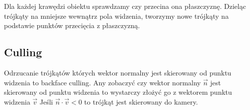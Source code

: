 \documentclass{../notatki}
\begin{document}
Dla każdej krawędzi obiektu sprawdzamy czy przecina ona płaszczyznę.
Dzieląc trójkąty na mniejsze wewnątrz pola widzenia, tworzymy nowe trójkąty na podstawie punktów przecięcia z płaszczyzną.

\subsection{Culling}

Odrzucanie trójkątów których wektor normalny jest skierowany od punktu widzenia to backface culling.
Any zobaczyć czy wektor normalny $\vec{n}$ jest skierowany od punktu widzenia to wystarczy złożyć go z wektorem punktu widzenia $\vec{v}$
Jeśli $\vec{n} \cdot \vec{v} < 0$ to trójkąt jest skierowany do kamery.
\end{document}
